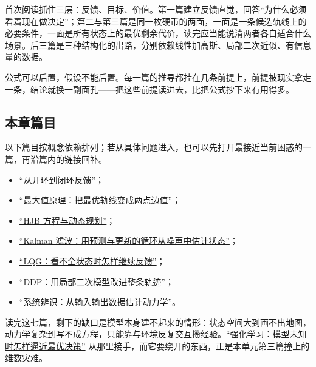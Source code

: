首次阅读抓住三层：反馈、目标、价值。第一篇建立反馈直觉，回答``为什么必须看着现在做决定''；第二与第三篇是同一枚硬币的两面，一面是一条候选轨线上的必要条件，一面是所有状态上的最优剩余代价，读完应当能说清两者各自适合什么场景。后三篇是三种结构化的出路，分别依赖线性加高斯、局部二次近似、有信息量的数据。

公式可以后置，假设不能后置。每一篇的推导都挂在几条前提上，前提被现实拿走一条，结论就换一副面孔——把这些前提读进去，比把公式抄下来有用得多。

\subsection{本章篇目}

以下篇目按概念依赖排列；若从具体问题进入，也可以先打开最接近当前困惑的一篇，再沿篇内的链接回补。

\begin{itemize}
\tightlist
\item \hyperref[sec:16-Control-and-Reinforcement-Learning/01-Optimal-Control/01]{``从开环到闭环反馈''}；
\item \hyperref[sec:16-Control-and-Reinforcement-Learning/01-Optimal-Control/02]{``最大值原理：把最优轨线变成两点边值''}；
\item \hyperref[sec:16-Control-and-Reinforcement-Learning/01-Optimal-Control/03]{``HJB 方程与动态规划''}；
\item \hyperref[sec:16-Control-and-Reinforcement-Learning/01-Optimal-Control/04]{``Kalman 滤波：用预测与更新的循环从噪声中估计状态''}；
\item \hyperref[sec:16-Control-and-Reinforcement-Learning/01-Optimal-Control/05]{``LQG：看不全状态时怎样继续反馈''}；
\item \hyperref[sec:16-Control-and-Reinforcement-Learning/01-Optimal-Control/06]{``DDP：用局部二次模型改进整条轨迹''}；
\item \hyperref[sec:16-Control-and-Reinforcement-Learning/01-Optimal-Control/07]{``系统辨识：从输入输出数据估计动力学''}。
\end{itemize}

读完这七篇，剩下的缺口是模型本身建不起来的情形：状态空间大到画不出地图，动力学复杂到写不成方程，只能靠与环境反复交互攒经验。\hyperref[ch:139]{``强化学习：模型未知时怎样逼近最优决策''} 从那里接手，而它要绕开的东西，正是本单元第三篇撞上的维数灾难。
